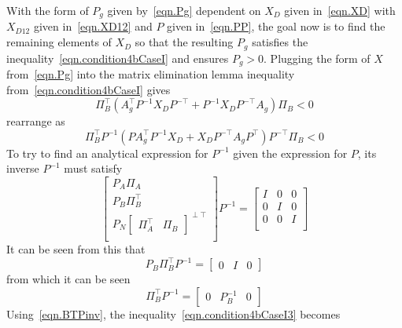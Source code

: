 With the form of $P_{g}$ given by\ \eqref{eqn.Pg} dependent on $X_{D}$ given in\ \eqref{eqn.XD} with $X_{D12}$ given in\ \eqref{eqn.XD12} and $P$ given in\ \eqref{eqn.PP}, the goal now is to find the remaining elements of $X_{D}$ so that the resulting $P_{g}$ satisfies the inequality\ \eqref{eqn.condition4bCaseI} and ensures $P_{g}>0$.
Plugging the form of $X$ from\ \eqref{eqn.Pg} into the matrix elimination lemma inequality from\ \eqref{eqn.condition4bCaseI} gives
\begin{equation}
  \label{eqn.condition4bCaseI2}
  \Pi_{B}^{\top}(A_{g}^{\top}P^{-1}X_{D}P^{-\top} + P^{-1}X_{D}P^{-\top}A_{g})\Pi_{B} < 0
\end{equation}
rearrange as
\begin{equation}
  \label{eqn.condition4bCaseI3}
  \Pi_{B}^{\top}P^{-1} (PA_{g}^{\top}P^{-1}X_{D} + X_{D}P^{-\top}A_{g}P^{\top}) P^{-\top}\Pi_{B} < 0
\end{equation}
To try to find an analytical expression for $P^{-1}$ given the expression for $P$, its inverse $P^{-1}$ must satisfy
\begin{equation}
  \label{eqn.PexpandedTimesPinv}
  \begin{bmatrix}
    P_{A}\Pi_{A} \\
    P_{B}\Pi_{B}^{\top} \\
    P_{N}
    \begin{bmatrix}
      \Pi_{A}^{\top} & \Pi_{B}
    \end{bmatrix}^{\perp\top} \\
  \end{bmatrix}
  P^{-1}
  =
  \begin{bmatrix}
  I & 0 & 0 \\
  0 & I & 0 \\
  0 & 0 & I \\
  \end{bmatrix}
\end{equation}
It can be seen from this that
\begin{equation}
  P_{B}\Pi_{B}^{\top}P^{-1} =
  \begin{bmatrix}
    0 & I & 0
  \end{bmatrix}
\end{equation}
from which it can be seen
\begin{equation}
  \label{eqn.BTPinv}
  \Pi_{B}^{\top}P^{-1} =
  \begin{bmatrix}
    0 & P_{B}^{-1} & 0
  \end{bmatrix}
\end{equation}
Using\ \eqref{eqn.BTPinv}, the inequality\ \eqref{eqn.condition4bCaseI3} becomes
